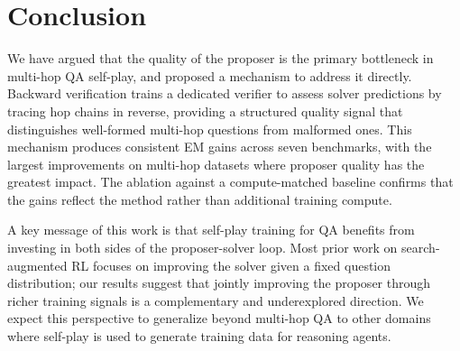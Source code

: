 \documentclass{article}
\begin{document}
\begin{table}[t]
\centering
\caption{Learning dynamics with increasing iterations (EM, Qwen2.5-3B). DrZero iteration numbers are taken from the original paper.}
\label{tab:dynamics}
\tiny
{}
\end{table}


\section{Conclusion}
We have argued that the quality of the proposer is the primary bottleneck in multi-hop QA self-play, and proposed a mechanism to address it directly.
Backward verification trains a dedicated verifier to assess solver predictions by tracing hop chains in reverse, providing a structured quality signal that distinguishes well-formed multi-hop questions from malformed ones.
This mechanism produces consistent EM gains across seven benchmarks, with the largest improvements on multi-hop datasets where proposer quality has the greatest impact.
The ablation against a compute-matched baseline confirms that the gains reflect the method rather than additional training compute.

A key message of this work is that self-play training for QA benefits from investing in both sides of the proposer-solver loop.
Most prior work on search-augmented RL focuses on improving the solver given a fixed question distribution; our results suggest that jointly improving the proposer through richer training signals is a complementary and underexplored direction.
We expect this perspective to generalize beyond multi-hop QA to other domains where self-play is used to generate training data for reasoning agents.
\end{document}
